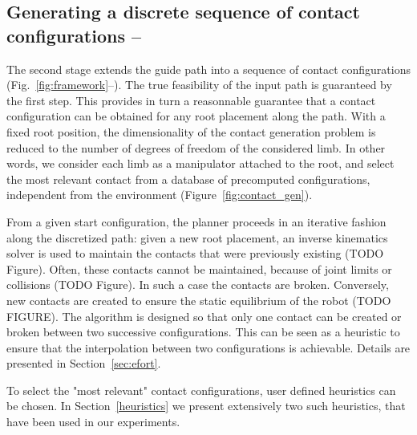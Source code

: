 \subsection{Generating a discrete sequence of contact configurations -- \Pb}

The second stage extends the guide path into a sequence of contact configurations (Fig.~\ref{fig:framework}--\Pb). The true feasibility of the input path is guaranteed by the first step.
This provides in turn a reasonnable guarantee that a contact configuration can be obtained for any root placement along the path. With a fixed root position, the dimensionality of the 
contact generation problem is reduced to the number of degrees of freedom of the considered limb. In other words, we consider each limb as a manipulator attached to the root, and select the most relevant contact from a database of precomputed configurations, independent from the environment (Figure~\ref{fig:contact_gen}).

From a given start configuration, the planner proceeds in an iterative fashion along the discretized path: given a new root placement, an inverse kinematics solver 
is used to maintain the contacts that were previously existing (TODO Figure). Often, these contacts cannot be maintained, because of joint limits or collisions (TODO Figure).
In such a case the contacts are broken. Conversely, new contacts are created to ensure the static equilibrium of the robot (TODO FIGURE).
The algorithm is designed so that only one contact can be created or broken between two successive configurations. This can be seen as a heuristic to ensure
that the interpolation between two configurations is achievable.
Details are presented in Section~\ref{sec:efort}. 

To select the "most relevant" contact configurations, user defined heuristics can be chosen. In Section~\ref{heuristics} we present extensively two such heuristics, that have been
used in our experiments.



